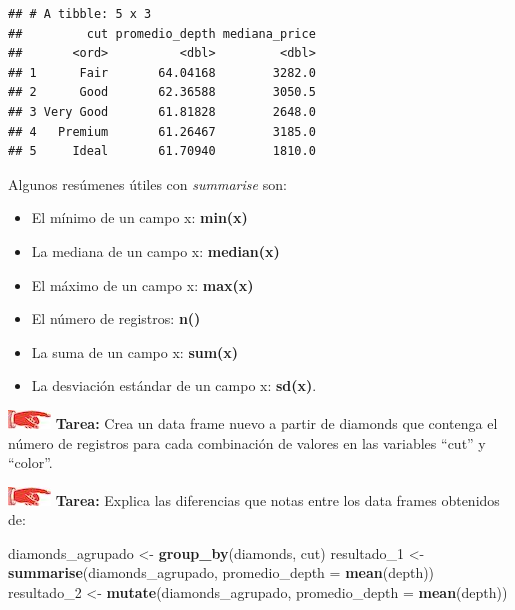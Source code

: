 \documentclass[]{book}
\newenvironment{Shaded}{\begin{snugshade}}{\end{snugshade}}
\newcommand{\KeywordTok}[1]{\textcolor[rgb]{0.13,0.29,0.53}{\textbf{#1}}}
\newcommand{\DataTypeTok}[1]{\textcolor[rgb]{0.13,0.29,0.53}{#1}}
\newcommand{\DecValTok}[1]{\textcolor[rgb]{0.00,0.00,0.81}{#1}}
\newcommand{\StringTok}[1]{\textcolor[rgb]{0.31,0.60,0.02}{#1}}
\newcommand{\NormalTok}[1]{#1}
\providecommand{\tightlist}{%
  \setlength{\itemsep}{0pt}\setlength{\parskip}{0pt}}
\theoremstyle{definition}
\theoremstyle{definition}
\theoremstyle{definition}
\theoremstyle{remark}
\begin{document}
\begin{verbatim}
## # A tibble: 5 x 3
##         cut promedio_depth mediana_price
##       <ord>          <dbl>         <dbl>
## 1      Fair       64.04168        3282.0
## 2      Good       62.36588        3050.5
## 3 Very Good       61.81828        2648.0
## 4   Premium       61.26467        3185.0
## 5     Ideal       61.70940        1810.0
\end{verbatim}

Algunos resúmenes útiles con \emph{summarise} son:

\begin{itemize}
\tightlist
\item
  El mínimo de un campo x: \textbf{min(x)}
\item
  La mediana de un campo x: \textbf{median(x)}
\item
  El máximo de un campo x: \textbf{max(x)}
\item
  El número de registros: \textbf{n()}
\item
  La suma de un campo x: \textbf{sum(x)}
\item
  La desviación estándar de un campo x: \textbf{sd(x)}.
\end{itemize}

\includegraphics{./imagenes/manicule.jpg} \textbf{Tarea:} Crea un data
frame nuevo a partir de diamonds que contenga el número de registros
para cada combinación de valores en las variables ``cut'' y ``color''.

\includegraphics{./imagenes/manicule.jpg} \textbf{Tarea:} Explica las
diferencias que notas entre los data frames obtenidos de:

\begin{Shaded}
\begin{Highlighting}[]
\NormalTok{diamonds_agrupado <-}\StringTok{ }\KeywordTok{group_by}\NormalTok{(diamonds, cut)}
\NormalTok{resultado_}\DecValTok{1}\NormalTok{ <-}\StringTok{ }\KeywordTok{summarise}\NormalTok{(diamonds_agrupado, }\DataTypeTok{promedio_depth =} \KeywordTok{mean}\NormalTok{(depth))}
\NormalTok{resultado_}\DecValTok{2}\NormalTok{ <-}\StringTok{ }\KeywordTok{mutate}\NormalTok{(diamonds_agrupado, }\DataTypeTok{promedio_depth =} \KeywordTok{mean}\NormalTok{(depth))}
\end{Highlighting}
\end{Shaded}
\end{document}
